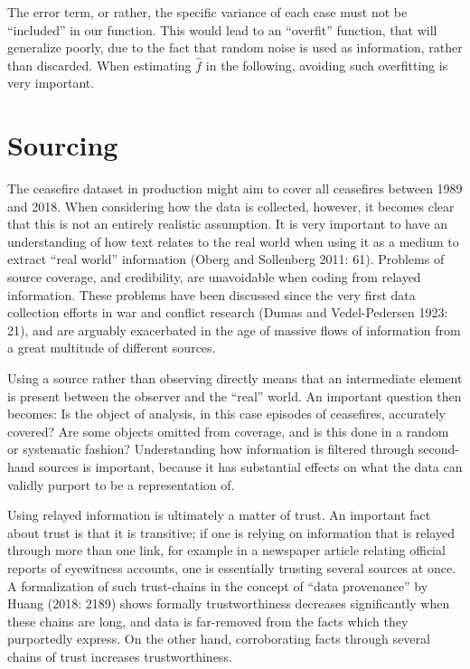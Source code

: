 \documentclass[12pt,twoside]{reedthesis}
\begin{document}
The error term, or rather, the specific variance of each case must not
be ``included'' in our function. This would lead to an ``overfit''
function, that will generalize poorly, due to the fact that random noise
is used as information, rather than discarded. When estimating
\(\hat{f}\) in the following, avoiding such overfitting is very
important.

\section{Sourcing}\label{sourcing}

The ceasefire dataset in production might aim to cover all ceasefires
between 1989 and 2018. When considering how the data is collected,
however, it becomes clear that this is not an entirely realistic
assumption. It is very important to have an understanding of how text
relates to the real world when using it as a medium to extract ``real
world'' information (Oberg and Sollenberg 2011: 61). Problems of source
coverage, and credibility, are unavoidable when coding from relayed
information. These problems have been discussed since the very first
data collection efforts in war and conflict research (Dumas and
Vedel-Pedersen 1923: 21), and are arguably exacerbated in the age of
massive flows of information from a great multitude of different
sources.

Using a source rather than observing directly means that an intermediate
element is present between the observer and the ``real'' world. An
important question then becomes: Is the object of analysis, in this case
episodes of ceasefires, accurately covered? Are some objects omitted
from coverage, and is this done in a random or systematic fashion?
Understanding how information is filtered through second-hand sources is
important, because it has substantial effects on what the data can
validly purport to be a representation of.

Using relayed information is ultimately a matter of trust. An important
fact about trust is that it is transitive; if one is relying on
information that is relayed through more than one link, for example in a
newspaper article relating official reports of eyewitness accounts, one
is essentially trusting several sources at once. A formalization of such
trust-chains in the concept of ``data provenance'' by Huang (2018: 2189)
shows formally trustworthiness decreases significantly when these chains
are long, and data is far-removed from the facts which they purportedly
express. On the other hand, corroborating facts through several chains
of trust increases trustworthiness.
\end{document}
